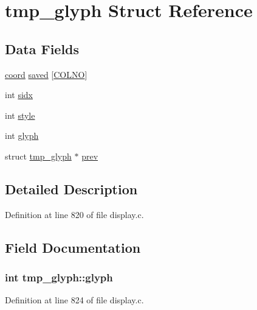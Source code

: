 \hypertarget{structtmp__glyph}{\section{tmp\+\_\+glyph Struct Reference}
\label{structtmp__glyph}
}
\subsection*{Data Fields}
\begin{DoxyCompactItemize}
\item 
\hyperlink{structcoord}{coord} \hyperlink{structtmp__glyph_a8db5e1fe6036daa9a46d8ce11cff5ef2}{saved} \mbox{[}\hyperlink{gnmap_8c_a308dbfcc29f5a427c0315f3cbf03c3ed}{C\+O\+L\+N\+O}\mbox{]}
\item 
int \hyperlink{structtmp__glyph_acc72da60bdb24619fb87687d4575269a}{sidx}
\item 
int \hyperlink{structtmp__glyph_ac6a6f9a0c1bf366f610a0195d9168d36}{style}
\item 
int \hyperlink{structtmp__glyph_af4743a6cc16459f8e4ef775e5ebbc96a}{glyph}
\item 
struct \hyperlink{structtmp__glyph}{tmp\+\_\+glyph} $\ast$ \hyperlink{structtmp__glyph_a6766a3de9a941b007ad6908f10b1a296}{prev}
\end{DoxyCompactItemize}


\subsection{Detailed Description}


Definition at line 820 of file display.\+c.



\subsection{Field Documentation}
\hypertarget{structtmp__glyph_af4743a6cc16459f8e4ef775e5ebbc96a}{
\subsubsection[{glyph}]{\setlength{\rightskip}{0pt plus 5cm}int tmp\+\_\+glyph\+::glyph}}\label{structtmp__glyph_af4743a6cc16459f8e4ef775e5ebbc96a}


Definition at line 824 of file display.\+c.



